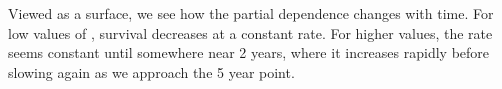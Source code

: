 \documentclass[article]{jss}
\begin{document}
Viewed as a surface, we see how the partial dependence changes with time. For low values of , survival decreases at a constant rate. For higher values, the rate seems constant until somewhere near 2 years, where it increases rapidly before slowing again as we approach the 5 year point.
\end{document}
